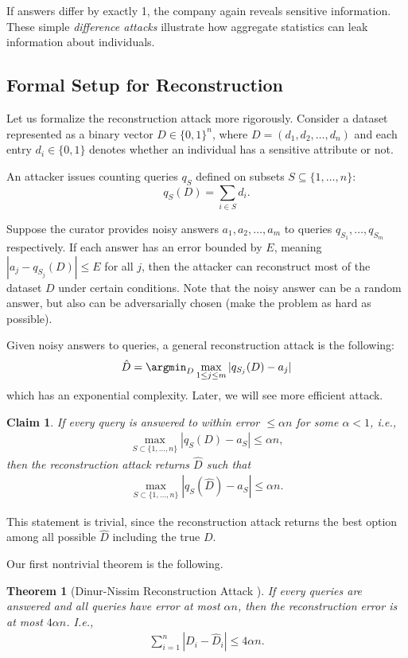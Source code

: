 \documentclass[11pt, a4paper]{article}
\newtheorem{theorem}{Theorem}
\newtheorem{claim}{Claim}
\begin{document}
If answers differ by exactly 1, the company again reveals sensitive information. 
These simple \emph{difference attacks} illustrate how aggregate statistics can leak information about individuals.

\subsection{Formal Setup for Reconstruction}

Let us formalize the reconstruction attack more rigorously. Consider a dataset represented as a binary vector $D \in \{0,1\}^n$, where $D=(d_1,d_2,\dots,d_n)$ and each entry $d_i \in \{0,1\}$ denotes whether an individual has a sensitive attribute or not.

An attacker issues counting queries $q_S$ defined on subsets $S \subseteq \{1,\dots,n\}$:
\[
q_S(D) = \sum_{i \in S} d_i.
\]

Suppose the curator provides noisy answers $a_1, a_2, \dots, a_m$ to queries $q_{S_1}, \dots, q_{S_m}$ respectively.
If each answer has an error bounded by $E$, meaning $|a_j - q_{S_j}(D)| \le E$ for all $j$, then the attacker can reconstruct most of the dataset $D$ under certain conditions.
Note that the noisy answer can be a random answer, but also can be adversarially chosen (make the problem as hard as possible).

Given noisy answers to queries, a general reconstruction attack is the following:
\begin{align}
    \hat{D} = \argmin_D \max_{1\leq j\leq m} |q_{S_j}(D) - a_j|
\end{align}
which has an exponential complexity.
Later, we will see more efficient attack.
\begin{claim}
    If every query is answered to within error $\leq \alpha n$ for some $\alpha<1$, i.e.,
    \begin{align}
        \max_{S\subset \{1, \dots, n\}} |q_S(D) - a_S| \leq \alpha n,
    \end{align}
    then the reconstruction attack returns $\hat{D}$ such that
    \begin{align}
        \max_{S\subset \{1, \dots, n\}} |q_S(\hat{D}) - a_S| \leq \alpha n.
    \end{align}
\end{claim}
This statement is trivial, since the reconstruction attack returns the best option among all possible $\hat{D}$ including the true $D$.

Our first nontrivial theorem is the following.
\begin{theorem}[Dinur-Nissim Reconstruction Attack \cite{DinurNissim2003}]
    If every queries are answered and all queries have error at most $\alpha n$, then the reconstruction error is at most $4\alpha n$. I.e.,
    \begin{align}
        \sum_{i=1}^n |D_i - \hat{D}_i| \leq 4\alpha n.
    \end{align}
\end{theorem}
\end{document}
